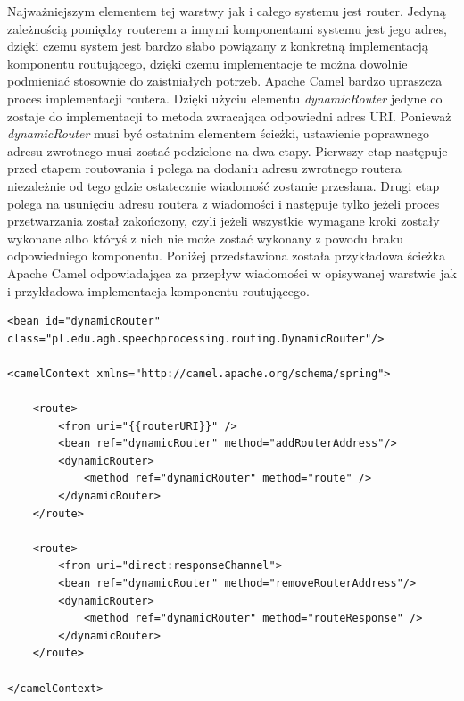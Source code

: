 Najważniejszym elementem tej warstwy jak i całego systemu jest router. Jedyną zależnością pomiędzy routerem a innymi komponentami systemu jest jego adres, dzięki czemu system jest bardzo słabo powiązany z konkretną implementacją komponentu routującego, dzięki czemu implementacje te można dowolnie podmieniać stosownie do zaistniałych potrzeb. Apache Camel bardzo upraszcza proces implementacji routera. Dzięki użyciu elementu \textit{dynamicRouter} jedyne co zostaje do implementacji to metoda zwracająca odpowiedni adres URI. Ponieważ \textit{dynamicRouter} musi być ostatnim elementem ścieżki, ustawienie poprawnego adresu zwrotnego musi zostać podzielone na dwa etapy. Pierwszy etap następuje przed etapem routowania i polega na dodaniu adresu zwrotnego routera niezależnie od tego gdzie ostatecznie wiadomość zostanie przesłana. Drugi etap polega na usunięciu adresu routera z wiadomości i następuje tylko jeżeli proces przetwarzania został zakończony, czyli jeżeli wszystkie wymagane kroki zostały wykonane albo któryś z nich nie może zostać wykonany z powodu braku odpowiedniego komponentu. Poniżej przedstawiona została przykładowa ścieżka Apache Camel odpowiadająca za przepływ wiadomości w opisywanej warstwie jak i przykładowa implementacja komponentu routującego.


\begin{center}
\begin{lstlisting}
<bean id="dynamicRouter" class="pl.edu.agh.speechprocessing.routing.DynamicRouter"/>

<camelContext xmlns="http://camel.apache.org/schema/spring">

	<route>
		<from uri="{{routerURI}}" />
		<bean ref="dynamicRouter" method="addRouterAddress"/>
		<dynamicRouter>
			<method ref="dynamicRouter" method="route" />
		</dynamicRouter>
	</route>

	<route>
		<from uri="direct:responseChannel">
		<bean ref="dynamicRouter" method="removeRouterAddress"/>
		<dynamicRouter>
			<method ref="dynamicRouter" method="routeResponse" />
		</dynamicRouter>
	</route>

</camelContext>

\end{lstlisting}
\end{center}

\lstset{language=Java, tabsize=4, caption=Implementacja metody routującej wiadomości do odpowiednich komponentów przetwarzania mowy.,label=lst:router_impl}

